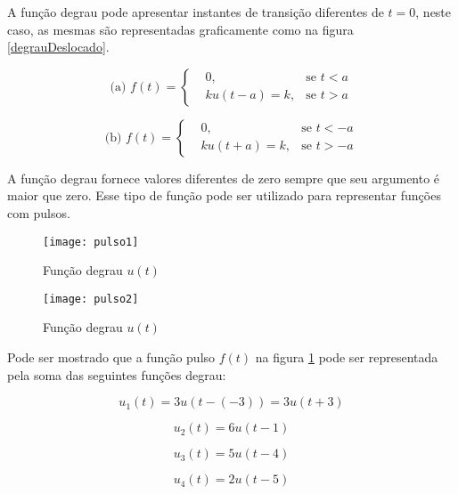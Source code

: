 \documentclass[12pt,fleqn]{book} %
\begin{document}
A função degrau pode apresentar instantes de transição diferentes de $t=0$, neste caso, as mesmas são representadas graficamente como na figura \ref{degrauDeslocado}.

\begin{equation}\label{u(t)}
\text{(a) }f(t) =\left\{\begin{aligned}  & 
        0,&\text{se }t<a\\&       
        ku(t-a) = k,&\text{se }t>a
    \end{aligned}\right.
\end{equation}

\begin{equation}\label{u(t)}
\text{(b) }f(t) =\left\{\begin{aligned}  & 
        0,&\text{se }t<-a\\&       
        ku(t+a) = k,&\text{se }t>-a
    \end{aligned}\right.
\end{equation}

A função degrau fornece valores diferentes de zero sempre que seu argumento é maior que zero. Esse tipo de função pode ser utilizado para representar funções com pulsos.

\begin{figure}[!htbp] \centering\texttt{[image: pulso1]}
            \caption{Função degrau $u(t)$}\label{pulso1} 
        \end{figure}
        \begin{figure}[!htbp] \centering\texttt{[image: pulso2]}
            \caption{Função degrau $u(t)$}\label{pulso2} 
        \end{figure}

Pode ser mostrado que a função pulso $f(t)$ na figura \ref{pulso1} pode ser representada pela soma das seguintes funções degrau:

\begin{equation}
u_1 (t)=3u(t-(-3))=3u(t+3)
\end{equation}

\begin{equation}
u_2 (t)=6u(t-1)
\end{equation}

\begin{equation}
u_3 (t)=5u(t-4)
\end{equation}

\begin{equation}
u_4 (t)=2u(t-5)
\end{equation}
\end{document}
